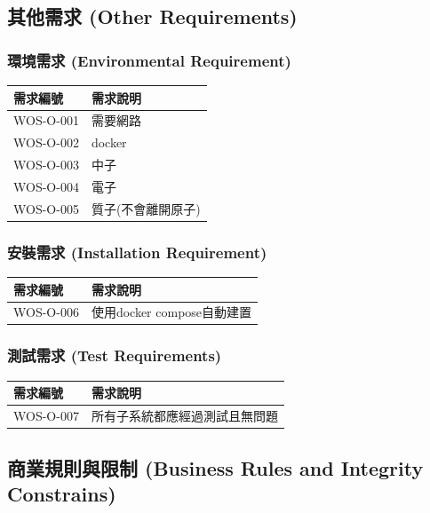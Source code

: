 \documentclass[a4paper, 12pt]{article}
\begin{document}
\subsection{其他需求 (Other Requirements)}
\subsubsection{環境需求 (Environmental Requirement)}
\begin{center}
    \begin{tabular}{ | p{6.5em} | p{32em} |}
    \hline
    需求編號 & 需求說明 \\ 
    \hline
    WOS-O-001 & 需要網路\\ 
    \hline
    WOS-O-002 & docker\\ 
    \hline
    WOS-O-003 & 中子\\ 
    \hline
    WOS-O-004 & 電子\\ 
    \hline
    WOS-O-005 & 質子(不會離開原子)\\ 
    \hline
    \end{tabular}
\end{center}
\subsubsection{安裝需求 (Installation Requirement)}
\begin{center}
    \begin{tabular}{ | p{6.5em} | p{32em} |}
    \hline
    需求編號 & 需求說明 \\ 
    \hline
    WOS-O-006 & 使用docker compose自動建置\\ 
    \hline
    \end{tabular}
\end{center}

\subsubsection{測試需求 (Test Requirements)}
\begin{center}
    \begin{tabular}{ | p{6.5em} | p{32em} |}
    \hline
    需求編號 & 需求說明 \\ 
    \hline
    WOS-O-007 & 所有子系統都應經過測試且無問題\\ 
    \hline
    \end{tabular}
\end{center}

\subsection{商業規則與限制 (Business Rules and Integrity Constrains)}
\end{document}
